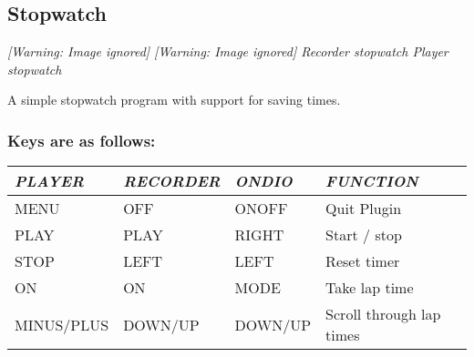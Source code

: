 \subsection{Stopwatch}
{\centering\itshape
  [Warning: Image ignored] %
 \textmd{  }  [Warning: Image ignored]
 \newline
Recorder stopwatch  Player stopwatch  
\par}

A simple stopwatch program with support for saving times.

\subsubsection{Keys are as follows:}

\begin{tabular}[c]{|p{2.9029999cm}|p{2.763cm}|p{2.199cm}|p{5.235cm}|}
\hline
{\centering\bfseries\itshape
PLAYER 
\par}
&
{\centering\bfseries\itshape
RECORDER 
\par}
&
{\centering\bfseries\itshape
ONDIO 
\par}
&
{\centering\bfseries\itshape
FUNCTION 
\par}
\\\hline
{\centering
MENU 
\par}
&
{\centering
OFF 
\par}
&
{\centering
ONOFF 
\par}
&
Quit Plugin 
\\\hline
{\centering
PLAY 
\par}
&
{\centering
PLAY 
\par}
&
{\centering
RIGHT 
\par}
&
Start / stop 
\\\hline
{\centering
STOP 
\par}
&
{\centering
LEFT
\par}
&
{\centering
LEFT 
\par}
&
Reset timer 
\\\hline
{\centering
ON 
\par}
&
{\centering
ON 
\par}
&
{\centering
MODE 
\par}
&
Take lap time 
\\\hline
{\centering
MINUS/PLUS 
\par}
&
{\centering
DOWN/UP 
\par}
&
{\centering
DOWN/UP 
\par}
&
Scroll through lap times
\\\hline
\end{tabular}
